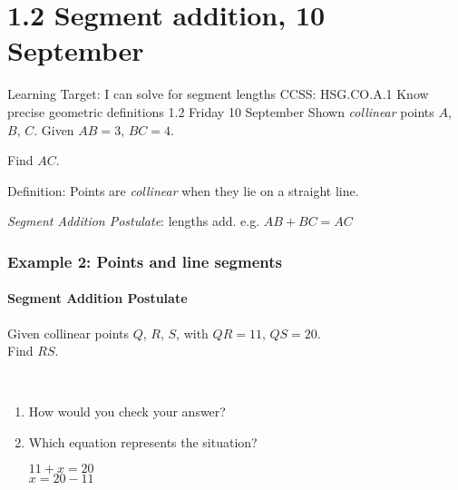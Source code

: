 \section{1.2 Segment addition, 10 September}
\begin{frame}{Learning Target: I can solve for segment lengths}
  {CCSS: HSG.CO.A.1 Know precise geometric definitions  \hfill \alert{1.2 Friday 10 September}}
  Shown \emph{collinear} points $A$, $B$, $C$. Given $AB=3$, $BC=4$. \par
  Find $AC$.
    \begin{center}
    \end{center} \vspace{1cm}
  Definition: Points are \emph{collinear} when they lie on a straight line. \par \medskip
  \emph{Segment Addition Postulate}: lengths add. e.g. $AB+BC=AC$
\end{frame}

\frame
{
  \frametitle{Example 2: Points and line segments}
  \framesubtitle{Segment Addition Postulate}
  Given collinear points $Q$, $R$, $S$, with $QR=11$, $QS=20$. \\[0.15in]
  Find $RS$. \\[0.25in]
       \\ \vspace{0.2cm}
    \begin{enumerate}
      \item How would you check your answer?
      \item Which equation represents the situation?
      \begin{multicols}{2}
        $11 + x = 20$ \\
        $x = 20 - 11$
      \end{multicols}
    \end{enumerate}
}

